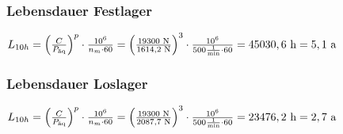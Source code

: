 \subsubsection{Lebensdauer Festlager}
$L_{10h}= \left( \frac{C}{P_{\text{äq}}} \right) ^p \cdot \frac{10^6}{n_m \cdot 60} = \left( \frac{19300 \text{ N}}{1614,2 \text{ N}} \right) ^3 \cdot \frac{10^6}{500 \frac{1}{\text{min}} \cdot 60} = 45030,6 \text{ h} = 5,1 \text{ a}$

\subsubsection{Lebensdauer Loslager}
$L_{10h}= \left( \frac{C}{P_{\text{äq}}} \right) ^p \cdot \frac{10^6}{n_m \cdot 60} = \left( \frac{19300 \text{ N}}{2087,7 \text{ N}} \right) ^3 \cdot \frac{10^6}{500 \frac{1}{\text{min}} \cdot 60} = 23476,2 \text{ h} = 2,7 \text{ a}$